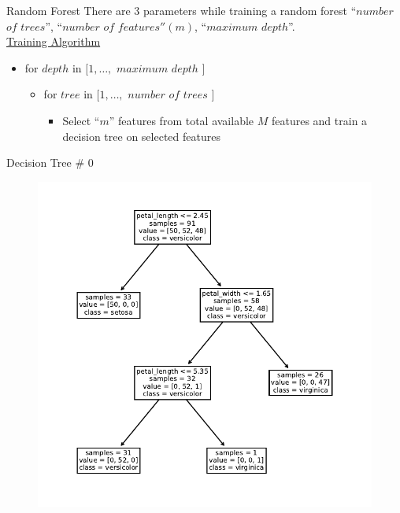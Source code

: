 \documentclass{beamer}
\begin{document}
	\begin{frame}{Random Forest}
	There are 3 parameters while training a random forest ``$number$ $of$ $trees$'', ``$number$ $of$ $features'' (m)$, ``$maximum$ $depth$''.\\
	\vspace{1cm}
	\underline{Training Algorithm}\\
	\begin{itemize}
		\item for $depth$ in $[1, \dots,$ $maximum$ $depth$ $]$
			\begin{itemize}
				\item for $tree$ in $[1, \dots,$ $number$ $of$ $trees$ $]$
				\begin{itemize}
					\item Select ``$m$'' features from total available $M$ features and train a decision tree on selected features
					
				\end{itemize}
			\end{itemize}
	\end{itemize}
	\end{frame}


\begin{frame}{Decision Tree \# 0}
\begin{figure}
	\includegraphics[scale=0.7]{tree-0.pdf}
\end{figure}
\end{frame}
\end{document}
